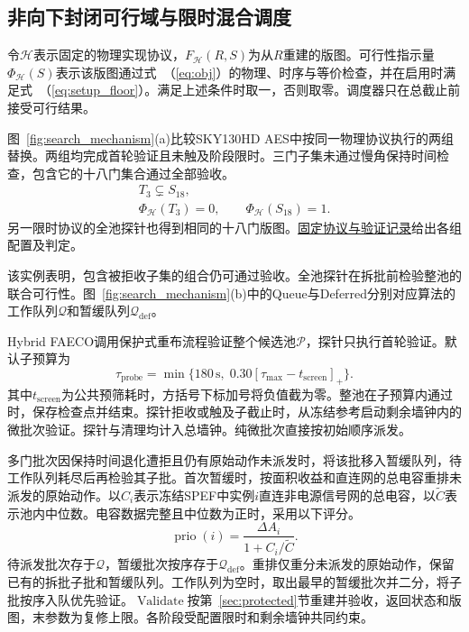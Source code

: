 \documentclass[twocolumn,10pt,fontset=windows]{ctexart}
\renewcommand{\eqref}[1]{\textup{（\ref{#1}）}}
\begin{document}
\subsection{非向下封闭可行域与限时混合调度}
\label{sec:sched}

令$\mathcal H$表示固定的物理实现协议，$F_{\mathcal H}(R,S)$为从$R$重建的版图。可行性指示量$\Phi_{\mathcal H}(S)$表示该版图通过式~\eqref{eq:obj}的物理、时序与等价检查，并在启用时满足式~\eqref{eq:setup_floor}。满足上述条件时取一，否则取零。调度器只在总截止前接受可行结果。

图~\ref{fig:search_mechanism}(a)比较SKY130HD AES中按同一物理协议执行的两组替换。两组均完成首轮验证且未触及阶段限时。三门子集未通过慢角保持时间检查，包含它的十八门集合通过全部验收。
\[
\begin{gathered}
T_3\subsetneq S_{18},\\
\Phi_{\mathcal H}(T_3)=0,\qquad\Phi_{\mathcal H}(S_{18})=1.
\end{gathered}
\]另一限时协议的全池探针也得到相同的十八门版图。\href{https://github.com/Toylog123/FAECO/blob/e191c4263db207e15c5420731c3b5163eac35171/project_docs/evidence/tcad_r10_counterexample_20261127/REPORT.md}{固定协议与验证记录}给出各组配置及判定。

该实例表明，包含被拒收子集的组合仍可通过验收。全池探针在拆批前检验整池的联合可行性。图~\ref{fig:search_mechanism}(b)中的Queue与Deferred分别对应算法的工作队列$\mathcal Q$和暂缓队列$\mathcal Q_{\mathrm{def}}$。

Hybrid FAECO调用保护式重布流程验证整个候选池$\mathcal P$，探针只执行首轮验证。默认子预算为
\begin{equation}
\label{eq:probe_budget}
\tau_{\mathrm{probe}}=\min\{180\,\mathrm s,\;0.30[\tau_{\max}-t_{\mathrm{screen}}]_+\}.
\end{equation}
其中$t_{\mathrm{screen}}$为公共预筛耗时，方括号下标加号将负值截为零。整池在子预算内通过时，保存检查点并结束。探针拒收或触及子截止时，从冻结参考启动剩余墙钟内的微批次验证。探针与清理均计入总墙钟。纯微批次直接按初始顺序派发。

多门批次因保持时间退化遭拒且仍有原始动作未派发时，将该批移入暂缓队列，待工作队列耗尽后再检验其子批。首次暂缓时，按面积收益和直连网的总电容重排未派发的原始动作。以$C_i$表示冻结SPEF中实例$i$直连非电源信号网的总电容，以$\widetilde C$表示池内中位数。电容数据完整且中位数为正时，采用以下评分。
\begin{equation}
\label{eq:cap_rerank}
\operatorname{prio}(i)=\frac{\Delta A_i}{1+C_i/\widetilde C}.
\end{equation}
待派发批次存于$\mathcal Q$，暂缓批次按序存于$\mathcal Q_{\mathrm{def}}$。重排仅重分未派发的原始动作，保留已有的拆批子批和暂缓队列。工作队列为空时，取出最早的暂缓批次并二分，将子批按序入队优先验证。$\operatorname{Validate}$按第~\ref{sec:protected}节重建并验收，返回状态和版图，末参数为复修上限。各阶段受配置限时和剩余墙钟共同约束。
\end{document}
